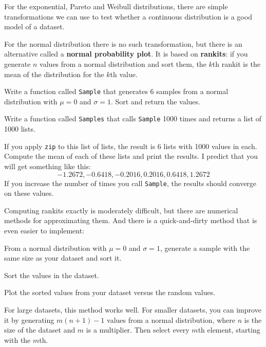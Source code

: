 \documentclass[12pt]{book}
\begin{document}
For the exponential, Pareto and Weibull distributions, there are
simple transformations we can use to test whether a continuous
distribution is a good model of a dataset.

For the normal distribution there is no such transformation, but there
is an alternative called a {\bf normal probability plot}.  It is based
on {\bf rankits}: if you generate $n$ values from a normal
distribution and sort them, the $k$th rankit is the mean of the
distribution for the $k$th value.

\begin{ex}

Write a function called {\tt Sample} that generates 6 samples from a
normal distribution with $\mu = 0$ and $\sigma = 1$.  Sort and return
the values.

Write a function called {\tt Samples} that calls {\tt Sample} 1000 times and
returns a list of 1000 lists.

If you apply {\tt zip} to this list of lists, the result is 6 lists
with 1000 values in each.  Compute the mean of each of these lists
and print the results.  I predict that you will get something like
this:
%
\[ -1.2672,   -0.6418,   -0.2016,   0.2016,   0.6418,   1.2672 \]
%
If you increase the number of times you call {\tt Sample}, the
results should converge on these values.

\end{ex}


Computing rankits exactly is moderately difficult, but there are
numerical methods for approximating them.  And there is a
quick-and-dirty method that is even easier to implement:

\begin{description}

\item From a normal distribution with $\mu = 0$ and $\sigma = 1$,
generate a sample with the same size as your dataset and sort it.

\item Sort the values in the dataset.

\item Plot the sorted values from your dataset versus the random values.

\end{description}

For large datasets, this method works well.
For smaller datasets, you can improve it by generating $m (n+1) - 1$
values from a normal distribution, where $n$ is the size of the
dataset and $m$ is a multiplier.  Then select every $m$th element,
starting with the $m$th.  
\end{document}
